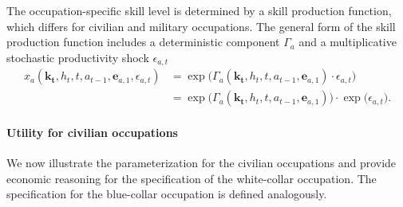 \noindent The occupation-specific skill level is determined by a skill production function, which differs for civilian and military occupations. The general form of the skill production function includes a deterministic component $\Gamma_a$ and a multiplicative stochastic productivity shock $\epsilon_{a,t}$
%
\begin{align}\label{eq:OccupationSpecificSkillLevel}
    x_{a}(\bm{k_t}, h_t, t, a_{t-1}, \bm{e}_{a, 1}, \epsilon_{a,t}) & = \exp \big( \Gamma_{a}(\bm{k_t},  h_t, t, a_{t-1}, \bm{e}_{a,1}) \cdot \epsilon_{a,t} \big) \nonumber \\
                & = \exp \big( \Gamma_a(\bm{k_t},  h_t, t, a_{t-1}, \bm{e}_{a,1}) \big) \cdot \exp \big( \epsilon_{a,t} \big).
\end{align}
\paragraph*{Utility for civilian occupations}
We now illustrate the parameterization for the civilian occupations and provide economic reasoning for the specification of the white-collar occupation. The specification for the blue-collar occupation is defined analogously.\\

